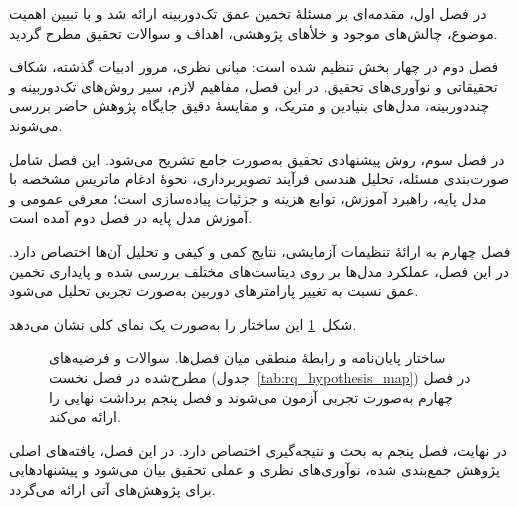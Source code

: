 در فصل اول، مقدمه‌ای بر مسئلهٔ تخمین عمق تک‌دوربینه ارائه شد و با تبیین اهمیت موضوع، چالش‌های موجود و خلأهای پژوهشی، اهداف و سوالات تحقیق مطرح گردید.

فصل دوم در چهار بخش تنظیم شده است: مبانی نظری، مرور ادبیات گذشته، شکاف تحقیقاتی و نوآوری‌های تحقیق. در این فصل، مفاهیم لازم، سیر روش‌های تک‌دوربینه و چنددوربینه، مدل‌های بنیادین و متریک، و مقایسهٔ دقیق جایگاه پژوهش حاضر بررسی می‌شوند.

در فصل سوم، روش پیشنهادی تحقیق به‌صورت جامع تشریح می‌شود. این فصل شامل صورت‌بندی مسئله، تحلیل هندسی فرآیند تصویربرداری، نحوهٔ ادغام ماتریس مشخصه با مدل پایه، راهبرد آموزش، توابع هزینه و جزئیات پیاده‌سازی است؛ معرفی عمومی و آموزش مدل پایه در فصل دوم آمده است.

فصل چهارم به ارائهٔ تنظیمات آزمایشی، نتایج کمی و کیفی و تحلیل آن‌ها اختصاص دارد. در این فصل، عملکرد مدل‌ها بر روی دیتاست‌های مختلف بررسی شده و پایداری تخمین عمق نسبت به تغییر پارامترهای دوربین به‌صورت تجربی تحلیل می‌شود.

شکل~\ref{fig:thesis_roadmap} این ساختار را به‌صورت یک نمای کلی نشان می‌دهد.

\begin{figure}[htbp]
    \centering
    \caption[ساختار پایان‌نامه]{ساختار پایان‌نامه و رابطهٔ منطقی میان فصل‌ها.
    سوالات و فرضیه‌های مطرح‌شده در فصل نخست (جدول~\ref{tab:rq_hypothesis_map})
    در فصل چهارم به‌صورت تجربی آزمون می‌شوند و فصل پنجم برداشت نهایی را ارائه می‌کند.}
    \label{fig:thesis_roadmap}
\end{figure}

در نهایت، فصل پنجم به بحث و نتیجه‌گیری اختصاص دارد. در این فصل، یافته‌های اصلی پژوهش جمع‌بندی شده، نوآوری‌های نظری و عملی تحقیق بیان می‌شود و پیشنهادهایی برای پژوهش‌های آتی ارائه می‌گردد.

